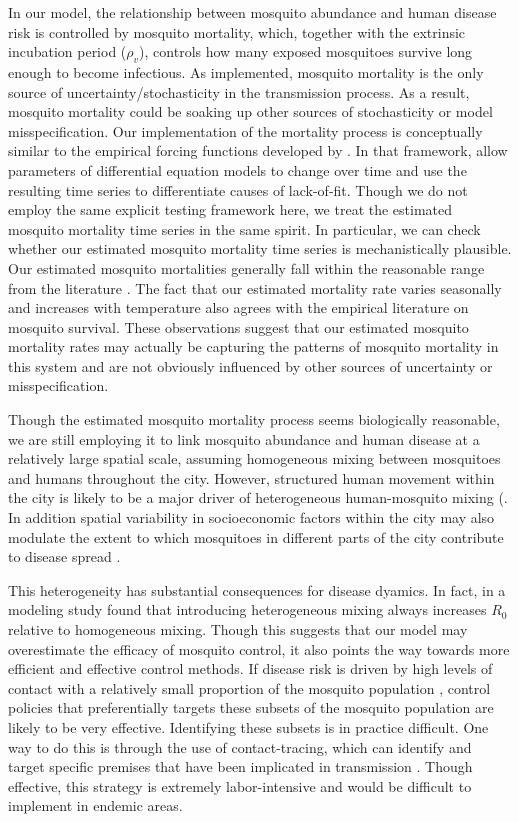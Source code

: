 \documentclass[10pt,letterpaper]{article}
\begin{document}
In our model, the relationship between mosquito abundance and human disease risk is controlled by mosquito mortality, which, together with the extrinsic incubation period ($\rho_v$), controls how  many exposed mosquitoes survive long enough to become infectious.
As implemented, mosquito mortality is the only source of uncertainty/stochasticity in the transmission process.
As a result, mosquito mortality could be soaking up other sources of stochasticity or model misspecification.
Our implementation of the mortality process is conceptually similar to the empirical forcing functions developed by \cite{Hooker2015}.
In that framework, \cite{Hooker2015} allow parameters of differential equation models to change over time and use the resulting time series to differentiate causes of lack-of-fit.
Though we do not employ the same explicit testing framework here, we treat the estimated mosquito mortality time series in the same spirit.
In particular, we can check whether our estimated mosquito mortality time series is mechanistically plausible.
Our estimated mosquito mortalities generally fall within the reasonable range from the literature \cite{Maciel-de-Freitas2008, Brady2013}.
The fact that our estimated mortality rate varies seasonally and increases with temperature also agrees with the empirical literature on mosquito survival.
These observations suggest that our estimated mosquito mortality rates may actually be capturing the patterns of mosquito mortality in this system and are not obviously influenced by other sources of uncertainty or misspecification.

Though the estimated mosquito mortality process seems biologically reasonable, we are still employing it to link mosquito abundance and human disease at a relatively large spatial scale, assuming homogeneous mixing between mosquitoes and humans throughout the city.
However, structured human movement within the city is likely to be a major driver of heterogeneous human-mosquito mixing (\cite{Adams2009, Cosner2009a, Stoddard2009, Dalziel2013}.
In addition spatial variability in socioeconomic factors within the city may also modulate the extent to which mosquitoes in different parts of the city contribute to disease spread \cite{Mondini2008, Honorio2009, Hu2012, DeMattosAlmeida2007}.

This heterogeneity has substantial consequences for disease dyamics.
In fact, in a modeling study \cite{Dye1986, Hasibeder1988} found that introducing heterogeneous mixing always increases $R_0$ relative to homogeneous mixing.
Though this suggests that our model may overestimate the efficacy of mosquito control, it also points the way towards more efficient and effective control methods.
If disease risk is driven by high levels of contact with a relatively small proportion of the mosquito population \cite{Canyon1999, Yoon2012}, control policies that preferentially targets these subsets of the mosquito population are likely to be very effective.
Identifying these subsets is in practice difficult.
One way to do this is through the use of contact-tracing, which can identify and target specific premises that have been implicated in transmission \cite{Vazquez-Prokopec2017}.
Though effective, this strategy is extremely labor-intensive and would be difficult to implement in endemic areas.
\end{document}
